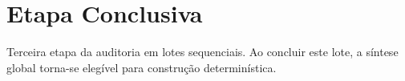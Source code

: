 \section{Etapa Conclusiva}
Terceira etapa da auditoria em lotes sequenciais.
Ao concluir este lote, a síntese global torna-se elegível para construção determinística.
